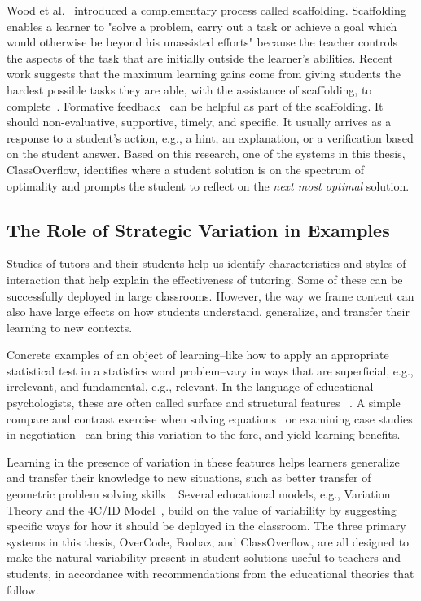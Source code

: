 Wood et al.~\cite{woodscaffolding} introduced a complementary process called scaffolding. Scaffolding enables a learner to "solve a problem, carry out a task or achieve a goal which would otherwise be beyond his unassisted efforts" because the teacher controls the aspects of the task that are initially outside the learner's abilities. Recent work suggests that the maximum learning gains come from giving students the hardest possible tasks they are able, with the assistance of scaffolding, to complete~\cite{zpd14}. Formative feedback~\cite{formative} can be helpful as part of the scaffolding. It should non-evaluative, supportive, timely, and specific. It usually arrives as a response to a student's action, e.g., a hint, an explanation, or a verification based on the student answer. Based on this research, one of the systems in this thesis, ClassOverflow, identifies where a student solution is on the spectrum of optimality and prompts the student to reflect on the {\it next most optimal} solution.

\subsection{The Role of Strategic Variation in Examples}

Studies of tutors and their students help us identify characteristics and styles of interaction that help explain the effectiveness of tutoring. Some of these can be successfully deployed in large classrooms. However, the way we frame content can also have large effects on how students understand, generalize, and transfer their learning to new contexts.

Concrete examples of an object of learning--like how to apply an appropriate statistical test in a statistics word problem--vary in ways that are superficial, e.g., irrelevant, and fundamental, e.g., relevant. In the language of educational psychologists, these are often called surface and structural features ~\cite{quilicimayer}. A simple compare and contrast exercise when solving equations~\cite{rittle2007does} or examining case studies in negotiation~\cite{loewenstein2003analogical} can bring this variation to the fore, and yield learning benefits.

Learning in the presence of variation in these features helps learners generalize and transfer their knowledge to new situations, such as better transfer of geometric problem solving skills~\cite{workedexamplesvariability,Variabilityofpractice}. Several educational models, e.g., Variation Theory and the 4C/ID Model~\cite{van2002blueprints}, build on the value of variability by suggesting specific ways for how it should be deployed in the classroom. The three primary systems in this thesis, OverCode, Foobaz, and ClassOverflow, are all designed to make the natural variability present in student solutions useful to teachers and students, in accordance with recommendations from the educational theories that follow.

